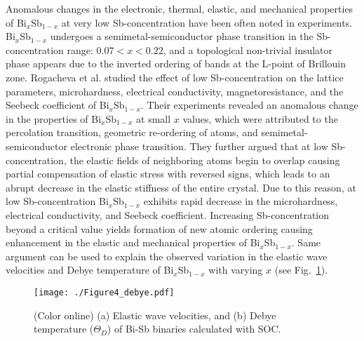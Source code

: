 \documentclass[twocolumn,superscriptaddress,nofootinbib,floatfix,aps,showpacs,prb,citeautoscript,reprint]{revtex4-1}
\begin{document}
Anomalous changes in the electronic, thermal, elastic, and mechanical properties of Bi$_{x}$Sb$_{1-x}$ at very low Sb-concentration have been often noted in experiments. Bi$_{x}$Sb$_{1-x}$ undergoes a semimetal-semiconductor phase transition in the Sb-concentration range: $0.07 < x < 0.22 $, and a topological non-trivial insulator phase appears due to the inverted ordering of bands at the L-point of Brillouin zone.\cite{LERNER1968, Brandt1972, Kane_bisb_2008, Hseih2008} Rogacheva et al.\cite{ROGACHEVA2008580} studied the effect of low Sb-concentration on the lattice parameters, microhardness, electrical conductivity, magnetoresistance, and the Seebeck coefficient of Bi$_{x}$Sb$_{1-x}$. Their experiments revealed an anomalous change in the properties of Bi$_{x}$Sb$_{1-x}$ at small $x$ values, which were attributed to the percolation transition, geometric re-ordering of atoms, and semimetal-semiconductor electronic phase transition. They further argued that at low Sb-concentration, the elastic fields of neighboring atoms begin to overlap causing partial compensation of elastic stress with reversed signs, which leads to an abrupt decrease in the elastic stiffness of the entire crystal.\cite{ROGACHEVA2008580} Due to this reason, at low Sb-concentration Bi$_{x}$Sb$_{1-x}$ exhibits rapid decrease in the microhardness, electrical conductivity, and Seebeck coefficient. Increasing Sb-concentration beyond a critical value yields formation of new atomic ordering causing enhancement in the elastic and mechanical properties of Bi$_{x}$Sb$_{1-x}$. Same argument can be used to explain the observed variation in the elastic wave velocities and Debye temperature of Bi$_{x}$Sb$_{1-x}$ with varying $x$ (see Fig.~\ref{fig:debye}).


\begin{figure}[htb!]
 \centering
 \texttt{[image: ./Figure4\_debye.pdf]}
 \caption{(Color online) (a) Elastic wave velocities, and (b) Debye temperature ($\Theta_D$) of Bi-Sb binaries calculated with SOC.}
 \label{fig:debye}
\end{figure}
\end{document}

